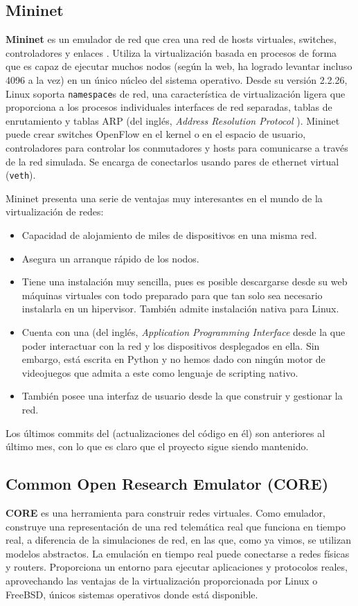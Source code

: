 \subsection{Mininet}
\textbf{Mininet} es un emulador de red que crea una red de hosts virtuales, switches, controladores y enlaces \cite{mininet}. Utiliza la virtualización basada en procesos de forma que es capaz de ejecutar muchos nodos (según la web, ha logrado levantar incluso 4096 a la vez) en un único núcleo del sistema operativo. Desde su versión 2.2.26, Linux soporta \texttt{namespace}s de red, una característica de virtualización ligera que proporciona a los procesos individuales interfaces de red separadas, tablas de enrutamiento y tablas ARP (del inglés, \textit{Address Resolution Protocol} \cite{rfcarp}). Mininet puede crear switches OpenFlow en el kernel o en el espacio de usuario, controladores para controlar los conmutadores y hosts para comunicarse a través de la red simulada. Se encarga de conectarlos usando pares de ethernet virtual (\texttt{veth}).

Mininet presenta una serie de ventajas muy interesantes en el mundo de la virtualización de redes:
\begin{itemize}
\item Capacidad de alojamiento de miles de dispositivos en una misma red. 
\item Asegura un arranque rápido de los nodos.
\item Tiene una instalación muy sencilla, pues es posible descargarse desde su web máquinas virtuales con todo preparado para que tan solo sea necesario instalarla en un hipervisor. También admite instalación nativa para Linux.
\item Cuenta con una  (del inglés, \textit{Application Programming Interface} desde la que poder interactuar con la red y los dispositivos desplegados en ella. Sin embargo, está escrita en Python y no hemos dado con ningún motor de videojuegos que admita a este como lenguaje de scripting nativo.
\item También posee una interfaz de usuario desde la que construir y gestionar la red.
\end{itemize}

Los últimos commits del  (actualizaciones del código en él) son anteriores al último mes, con lo que es claro que el proyecto sigue siendo mantenido.

\subsection{Common Open Research Emulator (CORE)}
\textbf{CORE} es una herramienta para construir redes virtuales. Como emulador, construye una representación de una red telemática real que funciona en tiempo real, a diferencia de la simulaciones de red, en las que, como ya vimos, se utilizan modelos abstractos. La emulación en tiempo real puede conectarse a redes físicas y routers. Proporciona un entorno para ejecutar aplicaciones y protocolos reales, aprovechando las ventajas de la virtualización proporcionada por Linux o FreeBSD, únicos sistemas operativos donde está disponible. 

